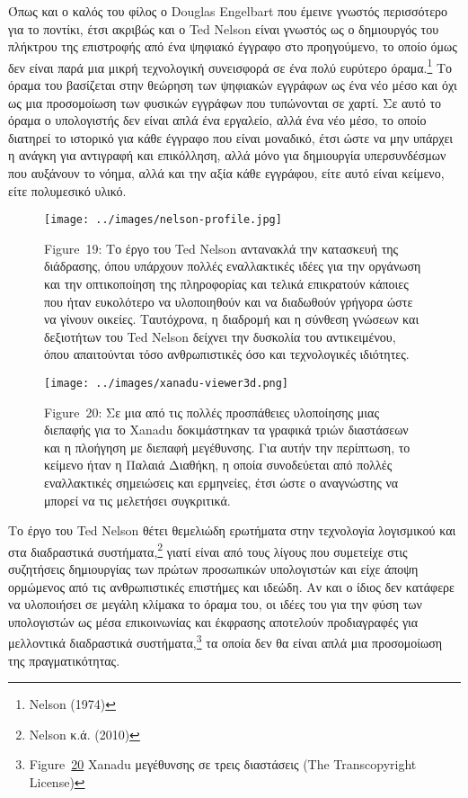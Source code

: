 \documentclass[
]{article}
\begin{document}
Όπως και ο καλός του φίλος ο Douglas Engelbart που έμεινε γνωστός
περισσότερο για το ποντίκι, έτσι ακριβώς και ο Ted Nelson είναι γνωστός
ως ο δημιουργός του πλήκτρου της επιστροφής από ένα ψηφιακό έγγραφο στο
προηγούμενο, το οποίο όμως δεν είναι παρά μια μικρή τεχνολογική
συνεισφορά σε ένα πολύ ευρύτερο όραμα.\footnote{Nelson (1974)} Το όραμα
του βασίζεται στην θεώρηση των ψηφιακών εγγράφων ως ένα νέο μέσο και όχι
ως μια προσομοίωση των φυσικών εγγράφων που τυπώνονται σε χαρτί. Σε αυτό
το όραμα ο υπολογιστής δεν είναι απλά ένα εργαλείο, αλλά ένα νέο μέσο,
το οποίο διατηρεί το ιστορικό για κάθε έγγραφο που είναι μοναδικό, έτσι
ώστε να μην υπάρχει η ανάγκη για αντιγραφή και επικόλληση, αλλά μόνο για
δημιουργία υπερσυνδέσμων που αυξάνουν το νόημα, αλλά και την αξία κάθε
εγγράφου, είτε αυτό είναι κείμενο, είτε πολυμεσικό υλικό.

\leavevmode{}%
\begin{figure}
\hypertarget{fig:nelson-profile}{%
\centering
\texttt{[image: ../images/nelson-profile.jpg]}
\caption{Figure~19: Το έργο του Ted Nelson αντανακλά την κατασκευή της
διάδρασης, όπου υπάρχουν πολλές εναλλακτικές ιδέες για την οργάνωση και
την οπτικοποίηση της πληροφορίας και τελικά επικρατούν κάποιες που ήταν
ευκολότερο να υλοποιηθούν και να διαδωθούν γρήγορα ώστε να γίνουν
οικείες. Ταυτόχρονα, η διαδρομή και η σύνθεση γνώσεων και δεξιοτήτων του
Ted Nelson δείχνει την δυσκολία του αντικειμένου, όπου απαιτούνται τόσο
ανθρωπιστικές όσο και τεχνολογικές ιδιότητες.}\label{fig:nelson-profile}
}
\end{figure}

\leavevmode{}%
\begin{figure}
\hypertarget{fig:xanadu-viewer3d}{%
\centering
\texttt{[image: ../images/xanadu-viewer3d.png]}
\caption{Figure~20: Σε μια από τις πολλές προσπάθειες υλοποίησης μιας
διεπαφής για το Xanadu δοκιμάστηκαν τα γραφικά τριών διαστάσεων και η
πλοήγηση με διεπαφή μεγέθυνσης. Για αυτήν την περίπτωση, το κείμενο ήταν
η Παλαιά Διαθήκη, η οποία συνοδεύεται από πολλές εναλλακτικές σημειώσεις
και ερμηνείες, έτσι ώστε ο αναγνώστης να μπορεί να τις μελετήσει
συγκριτικά.}\label{fig:xanadu-viewer3d}
}
\end{figure}

Το έργο του Ted Nelson θέτει θεμελιώδη ερωτήματα στην τεχνολογία
λογισμικού και στα διαδραστικά συστήματα,\footnote{Nelson κ.ά. (2010)}
γιατί είναι από τους λίγους που συμετείχε στις συζητήσεις δημιουργίας
των πρώτων προσωπικών υπολογιστών και είχε άποψη ορμώμενος από τις
ανθρωπιστικές επιστήμες και ιδεώδη. Αν και ο ίδιος δεν κατάφερε να
υλοποιήσει σε μεγάλη κλίμακα το όραμα του, οι ιδέες του για την φύση των
υπολογιστών ως μέσα επικοινωνίας και έκφρασης αποτελούν προδιαγραφές για
μελλοντικά διαδραστικά συστήματα,\footnote{Figure~\protect\hyperlink{fig:xanadu-viewer3d}{20}
  Xanadu μεγέθυνσης σε τρεις διαστάσεις (The Transcopyright License)} τα
οποία δεν θα είναι απλά μια προσομοίωση της πραγματικότητας.
\end{document}
